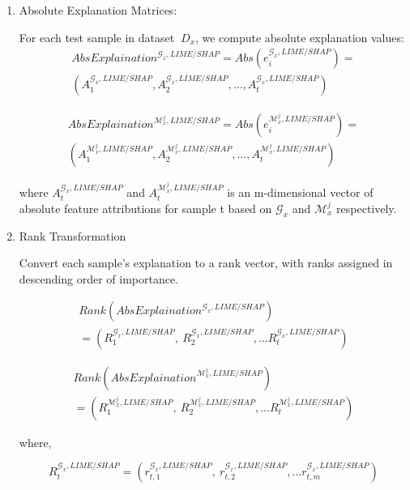 \documentclass{article}
\begin{document}
\begin{enumerate}
    \item Absolute Explanation Matrices:
    
    For each test sample in dataset ${\ D}_{x}$, we compute absolute explanation values:
\begin{align}
    {AbsExplaination}^{\mathcal{G}_{x},LIME/SHAP} = Abs(e_{i}^{\mathcal{G}_{x},LIME/SHAP}) = \nonumber \\ (A_{1}^{\mathcal{G}_{x},LIME/SHAP},A_{2}^{\mathcal{G}_{x},LIME/SHAP},\ldots,A_{t}^{\mathcal{G}_{x},LIME/SHAP}) \nonumber
\end{align}

\begin{align}
    {AbsExplaination}^{\mathcal{M}_{x}^{j},LIME/SHAP} = Abs(e_{i}^{\mathcal{M}_{x}^{j},LIME/SHAP}) = \nonumber \\ (A_{1}^{\mathcal{M}_{x}^{j},LIME/SHAP},A_{2}^{\mathcal{M}_{x}^{j},LIME/SHAP},\ldots,A_{t}^{\mathcal{M}_{x}^{j},LIME/SHAP}) \nonumber
\end{align}
    
    
    
    
    where $A_{t}^{\mathcal{G}_{x},LIME/SHAP}$ and $A_{t}^{\mathcal{M}_{x}^{j},LIME/SHAP}$ is an m-dimensional vector of absolute feature attributions for sample t based on $\mathcal{G}_{x}$ and $\mathcal{M}_{x}^{j}$ respectively.
    
    \item Rank Transformation
    
    Convert each sample's explanation to a rank vector, with ranks assigned in descending order of importance.

\begin{align}
    Rank\left( {AbsExplaination}^{\mathcal{G}_{x},LIME/SHAP} \right)
    \nonumber \\= (R_{1}^{\mathcal{G}_{x},LIME/SHAP},\ R_{2}^{\mathcal{G}_{x},LIME/SHAP},\ldots R_{t}^{\mathcal{G}_{x},LIME/SHAP})\nonumber
\end{align}
    
\begin{align}
    Rank\left( {AbsExplaination}^{\mathcal{M}_{x}^{j},LIME/SHAP} \right) \nonumber \\= (R_{1}^{\mathcal{M}_{x}^{j},LIME/SHAP},\ R_{2}^{\mathcal{M}_{x}^{j},LIME/SHAP},\ldots R_{t}^{\mathcal{M}_{x}^{j},LIME/SHAP})\nonumber
\end{align}
    
    
    where,
    
    $$R_{t}^{\mathcal{G}_{x},LIME/SHAP} = (r_{t,1}^{\mathcal{G}_{x},LIME/SHAP},\ r_{t,2}^{\mathcal{G}_{x},LIME/SHAP},\ldots r_{t,m}^{\mathcal{G}_{x},LIME/SHAP})$$
    

\end{enumerate}
\end{document}
